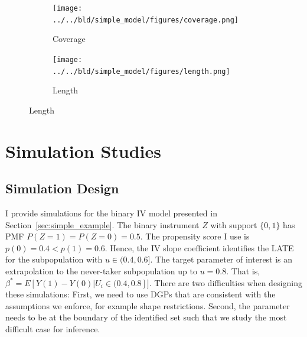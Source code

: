 \documentclass[12pt,a4paper,english]{article} %
\numberwithin{equation}{section}
\theoremstyle{definition}
\theoremstyle{remark}
\theoremstyle{plain}
\begin{document}
\begin{figure}

  \caption{Monte Carlo Simulation: Simple Kink Example}\label{fig:sims_simple_model}

  \centering
  \begin{subfigure}[b]{0.49\textwidth}
      \centering
      \texttt{[image: ../../bld/simple\_model/figures/coverage.png]}
      \caption{Coverage}\label{fig:sims_simple_model_coverage}
  \end{subfigure}
  \hfill
  \begin{subfigure}[b]{0.49\textwidth}
      \centering
      \texttt{[image: ../../bld/simple\_model/figures/length.png]}
      \caption{Length}\label{fig:sims_simple_model_length}
  \end{subfigure}



\end{figure}


\section{Simulation Studies}\label{sec:simulation_studies}

\subsection{Simulation Design}
I provide simulations for the binary IV model presented in Section~\ref{sec:simple_example}.
The binary instrument $Z$ with support $\{0,1\}$ has PMF $P(Z=1) = P(Z=0) = 0.5$.
The propensity score I use is $p(0) = 0.4 < p(1) = 0.6$.
Hence, the IV slope coefficient identifies the LATE for the subpopulation with $u\in(0.4, 0.6]$.
The target parameter of interest is an extrapolation to the never-taker subpopulation up to $u=0.8$.
That is, $\beta^* = E[Y(1) - Y(0) | U_i \in (0.4, 0.8]]$.
There are two difficulties when designing these simulations: First, we need to use DGPs that are consistent with the assumptions we enforce, for example shape restrictions.
Second, the parameter needs to be at the boundary of the identified set such that we study the most difficult case for inference.
\end{document}
